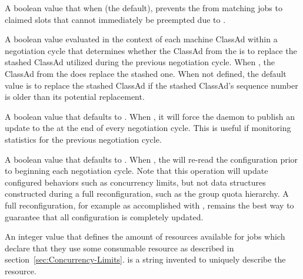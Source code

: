 \begin{description}
\label{param:NegotiatorConsiderEarlyPreemption}
\item[\Macro{NEGOTIATOR\_CONSIDER\_EARLY\_PREEMPTION}]
  A boolean value that when  (the default),
  prevents the  from matching jobs
  to claimed slots that cannot immediately be preempted
  due to .

\label{param:StartdAdReevalExpr}
\item[\Macro{STARTD\_AD\_REEVAL\_EXPR}]
  A boolean value evaluated in the context of each machine ClassAd within
  a negotiation cycle that determines whether the ClassAd from the
   is to replace the stashed ClassAd utilized during
  the previous negotiation cycle.
  When ,
  the ClassAd from the  does replace the stashed one.
  When not defined, the default value is to replace the stashed ClassAd
  if the stashed ClassAd's sequence number is older than its potential
  replacement.

\label{param:NegotiatorUpdateAfterCycle}
\item[\Macro{NEGOTIATOR\_UPDATE\_AFTER\_CYCLE}]
  A boolean value that defaults to .
  When , it will force the  daemon to publish 
  an update to the  at the end of every negotiation cycle.
  This is useful if monitoring statistics for the previous negotiation cycle. 

\label{param:NegotiatorReadConfigBeforeCycle}
\item[\Macro{NEGOTIATOR\_READ\_CONFIG\_BEFORE\_CYCLE}]
  A boolean value that defaults to .
  When , the  will re-read the configuration
  prior to beginning each negotiation cycle.  
  Note that this operation will update configured behaviors such as 
  concurrency limits, but not data structures
  constructed during a full reconfiguration,
  such as the group quota hierarchy.
  A full reconfiguration, for example as accomplished with ,
  remains the best way to 
  guarantee that all  configuration is completely updated.

\label{param:NameLimit}
\item[\Macro{<NAME>\_LIMIT}]
  An integer value that defines the amount of resources available for
  jobs which declare that they use some consumable resource 
  as described in section~\ref{sec:Concurrency-Limits}. 
   is a string invented to uniquely describe the resource.


\end{description}
